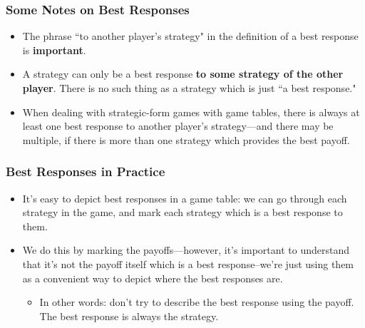 \begin{frame}
\frametitle{Some Notes on Best Responses}
\begin{itemize}
	\item The phrase ``to another player's strategy" in the definition of a best response is \textbf{important}.
	\item A strategy can only be a best response \textbf{to some strategy of the other player}. There is no such thing as a strategy which is just ``a best response."
	\item When dealing with strategic-form games with game tables, there is always at least one best response to another player's strategy---and there may be multiple, if there is more than one strategy which provides the best payoff.
\end{itemize}
\end{frame}

\begin{frame}
\frametitle{Best Responses in Practice}
\begin{itemize}
	\item It's easy to depict best responses in a game table: we can go through each strategy in the game, and mark each strategy which is a best response to them.
	\item We do this by marking the payoffs---however, it's important to understand that it's not the payoff itself which is a best response--we're just using them as a convenient way to depict where the best responses are.
	\begin{itemize}
		\item In other words: don't try to describe the best response using the payoff. The best response is always the strategy.
	\end{itemize}
\end{itemize}
\end{frame}

